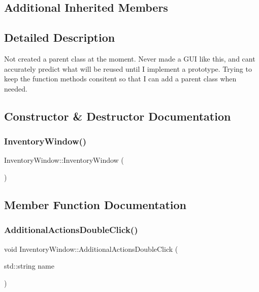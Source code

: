 \subsection*{Additional Inherited Members}


\subsection{Detailed Description}
Not created a parent class at the moment. Never made a G\+UI like this, and can\textquotesingle{}t accurately predict what will be reused until I implement a prototype. Trying to keep the function methods consitent so that I can add a parent class when needed. 

\subsection{Constructor \& Destructor Documentation}
\mbox{\label{class_inventory_window_a95caa6b7f5cc394cb24ce44d3cd423c0}} 
\subsubsection{\texorpdfstring{Inventory\+Window()}{InventoryWindow()}}
{\footnotesize\ttfamily Inventory\+Window\+::\+Inventory\+Window (\begin{DoxyParamCaption}{ }\end{DoxyParamCaption})}



\subsection{Member Function Documentation}
\mbox{\label{class_inventory_window_a184239af4739a83163b45c4bb72ff6ec}} 
\subsubsection{\texorpdfstring{Additional\+Actions\+Double\+Click()}{AdditionalActionsDoubleClick()}}
{\footnotesize\ttfamily void Inventory\+Window\+::\+Additional\+Actions\+Double\+Click (\begin{DoxyParamCaption}\item[{std\+::string}]{name }\end{DoxyParamCaption})\hspace{0.3cm}{\ttfamily [virtual]}}



